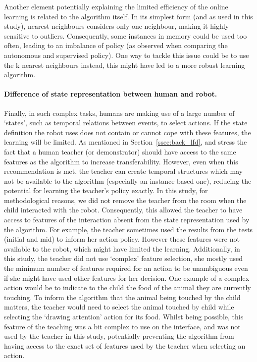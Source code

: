 Another element potentially explaining the limited efficiency of the online learning is related to the algorithm itself. In its simplest form (and as used in this study), nearest-neighbours considers only one neighbour, making it highly sensitive to outliers. Consequently, some instances in memory could be used too often, leading to an imbalance of policy (as observed when comparing the autonomous and supervised policy). One way to tackle this issue could be to use the k nearest neighbours instead, this might have led to a more robust learning algorithm. 

\paragraph{Difference of state representation between human and robot.}


Finally, in such complex tasks, humans are making use of a large number of `states', such as temporal relations between events, to select actions. If the state definition the robot uses does not contain or cannot cope with these features, the learning will be limited. As mentioned in Section~\ref{ssec:back_lfd}, \cite{knox2014learning} and \cite{sequeira2016discovering} stress the fact that a human teacher (or demonstrator) should have access to the same features as the algorithm to increase transferability. However, even when this recommendation is met, the teacher can create temporal structures which may not be available to the algorithm (especially an instance-based one), reducing the potential for learning the teacher's policy exactly. In this study, for methodological reasons, we did not remove the teacher from the room when the child interacted with the robot. Consequently, this allowed the teacher to have access to features of the interaction absent from the state representation used by the algorithm. For example, the teacher sometimes used the results from the tests (initial and mid) to inform her action policy. However these features were not available to the robot, which might have limited the learning. Additionally, in this study, the teacher did not use `complex' feature selection, she mostly used the minimum number of features required for an action to be unambiguous even if she might have used other features for her decision. One example of a complex action would be to indicate to the child the food of the animal they are currently touching. To inform the algorithm that the animal being touched by the child matters, the teacher would need to select the animal touched by child while selecting the `drawing attention' action for its food. Whilst being possible, this feature of the teaching was a bit complex to use on the interface, and was not used by the teacher in this study, potentially preventing the algorithm from having access to the exact set of features used by the teacher when selecting an action.


